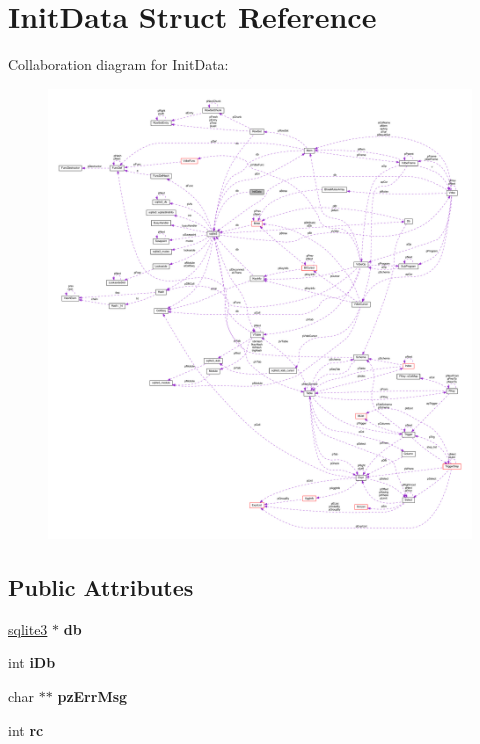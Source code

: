 \hypertarget{struct_init_data}{\section{Init\-Data Struct Reference}
\label{struct_init_data}
}


Collaboration diagram for Init\-Data\-:\nopagebreak
\begin{figure}[H]
\begin{center}
\leavevmode
\includegraphics[width=350pt]{struct_init_data__coll__graph}
\end{center}
\end{figure}
\subsection*{Public Attributes}
\begin{DoxyCompactItemize}
\item 
\hypertarget{struct_init_data_adc9e29c56e0392076e92d7f4b29fa272}{\hyperlink{structsqlite3}{sqlite3} $\ast$ {\bfseries db}}\label{struct_init_data_adc9e29c56e0392076e92d7f4b29fa272}

\item 
\hypertarget{struct_init_data_ad6c7953b49d351cd9fb14e3394010689}{int {\bfseries i\-Db}}\label{struct_init_data_ad6c7953b49d351cd9fb14e3394010689}

\item 
\hypertarget{struct_init_data_aa8aef34241ec214f038b38932ffe1357}{char $\ast$$\ast$ {\bfseries pz\-Err\-Msg}}\label{struct_init_data_aa8aef34241ec214f038b38932ffe1357}

\item 
\hypertarget{struct_init_data_a627153a3de2c4d159ae44ebc03961592}{int {\bfseries rc}}\label{struct_init_data_a627153a3de2c4d159ae44ebc03961592}

\end{DoxyCompactItemize}


